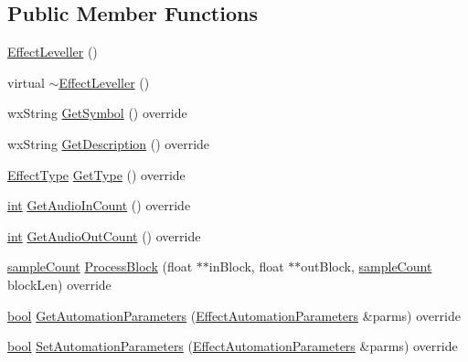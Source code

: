 \subsection*{Public Member Functions}
\begin{DoxyCompactItemize}
\item 
\hyperlink{class_effect_leveller_a04f49bb33517f77c476158cbc5ed6251}{Effect\+Leveller} ()
\item 
virtual \hyperlink{class_effect_leveller_a311cb1c6737edee1920f98f0d6cc2bbd}{$\sim$\+Effect\+Leveller} ()
\item 
wx\+String \hyperlink{class_effect_leveller_ab3f0645a094a214fdb7e8288076f2a35}{Get\+Symbol} () override
\item 
wx\+String \hyperlink{class_effect_leveller_af9b39cf783bd3f7bb20cdc652f803e08}{Get\+Description} () override
\item 
\hyperlink{_effect_interface_8h_a4809a7bb3fd1a421902a667cc1405d43}{Effect\+Type} \hyperlink{class_effect_leveller_a1282ccc3d1053422c51637534317dc07}{Get\+Type} () override
\item 
\hyperlink{xmltok_8h_a5a0d4a5641ce434f1d23533f2b2e6653}{int} \hyperlink{class_effect_leveller_a2d710ad5e6684fe7411b9163d0a9d460}{Get\+Audio\+In\+Count} () override
\item 
\hyperlink{xmltok_8h_a5a0d4a5641ce434f1d23533f2b2e6653}{int} \hyperlink{class_effect_leveller_afb46677880c7f161111ffca7e4418ba8}{Get\+Audio\+Out\+Count} () override
\item 
\hyperlink{include_2audacity_2_types_8h_afa427e1f521ea5ec12d054e8bd4d0f71}{sample\+Count} \hyperlink{class_effect_leveller_ab80cd8d6f133562bb975a8d2d9210489}{Process\+Block} (float $\ast$$\ast$in\+Block, float $\ast$$\ast$out\+Block, \hyperlink{include_2audacity_2_types_8h_afa427e1f521ea5ec12d054e8bd4d0f71}{sample\+Count} block\+Len) override
\item 
\hyperlink{mac_2config_2i386_2lib-src_2libsoxr_2soxr-config_8h_abb452686968e48b67397da5f97445f5b}{bool} \hyperlink{class_effect_leveller_a1be339feb8f8d386ed400cf1e4786c69}{Get\+Automation\+Parameters} (\hyperlink{class_effect_automation_parameters}{Effect\+Automation\+Parameters} \&parms) override
\item 
\hyperlink{mac_2config_2i386_2lib-src_2libsoxr_2soxr-config_8h_abb452686968e48b67397da5f97445f5b}{bool} \hyperlink{class_effect_leveller_aa5948dc6162f56442d9f4531bb436599}{Set\+Automation\+Parameters} (\hyperlink{class_effect_automation_parameters}{Effect\+Automation\+Parameters} \&parms) override
\item 

\end{DoxyCompactItemize}
